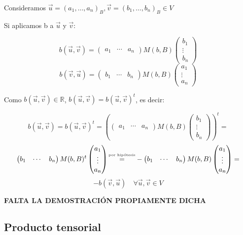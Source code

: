 \documentclass[x11names,table]{report}
\begin{document}
Consideramos $\vec{u}=(a_1,\dots,a_n)_B, \vec{v}=(b_1,\dots,b_n)_B\in V$

Si aplicamos b a $\vec{u}$ y $\vec{v}$:

\[b(\vec{u},\vec{v})=\begin{pmatrix}
a_1 & \cdots & a_n
\end{pmatrix}M(b,B)\begin{pmatrix}
b_1 \\ \vdots \\ b_n
\end{pmatrix}\]
\[b(\vec{v},\vec{u})=\begin{pmatrix}
b_1 & \cdots & b_n
\end{pmatrix}M(b,B)\begin{pmatrix}
a_1 \\ \vdots \\ a_n
\end{pmatrix}\]

Como $b(\vec{u},\vec{v})\in\mathbb{R}$, $b(\vec{u},\vec{v})=b(\vec{u},\vec{v})^t$, es decir:

\[b(\vec{u},\vec{v})=b(\vec{u},\vec{v})^t=\left(\begin{pmatrix}
a_1 & \cdots & a_n
\end{pmatrix}M(b,B)\begin{pmatrix}
b_1 \\ \vdots \\ b_n
\end{pmatrix}\right)^t=\]\[\begin{pmatrix}
b_1 & \cdots & b_n
\end{pmatrix}M(b,B)^t\begin{pmatrix}
a_1 \\ \vdots \\ a_n
\end{pmatrix}\shortstack{{\tiny{por hipótesis}}\\=}-\begin{pmatrix}
b_1 & \cdots & b_n
\end{pmatrix}M(b,B)\begin{pmatrix}
a_1 \\ \vdots \\ a_n
\end{pmatrix}=\]\[
-b(\vec{v},\vec{u})\quad\forall\vec{u},\vec{v}\in V\]

\textbf{FALTA LA DEMOSTRACIÓN PROPIAMENTE DICHA}

\subsection*{Producto tensorial}
\end{document}
